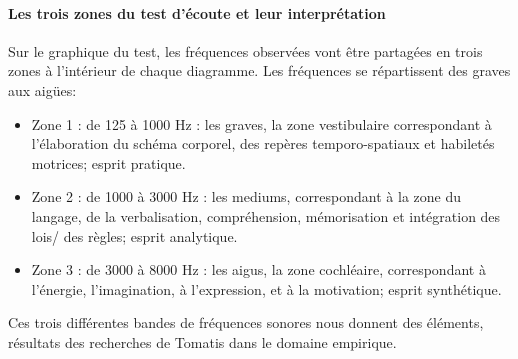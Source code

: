 \paragraph{Les trois zones du test d'écoute et leur interprétation}
Sur le graphique du test, les fréquences observées vont être partagées en
trois zones à l\textquoteright intérieur
de chaque diagramme. Les fréquences se répartissent des
graves aux aigües:
\begin{itemize}
	\item Zone 1 : de 125 à 1000 Hz : les graves, la zone vestibulaire correspondant à l'élaboration
	du schéma corporel, des repères temporo-spatiaux et habiletés motrices; 
	esprit pratique.
	\item Zone 2 : de 1000 à 3000 Hz : les mediums, correspondant à  la zone du langage, de la
	verbalisation, compréhension, %
	mémorisation %
	et intégration des lois/
	des règles; esprit analytique.
	\item Zone 3 : de 3000 à 8000 Hz : les aigus, la zone cochléaire, correspondant à l'énergie,
	 l'imagination, à l'expression, et à la motivation; esprit synthétique.
	
\end{itemize}
Ces trois différentes bandes de fréquences sonores nous donnent des éléments, résultats des   
recherches de Tomatis dans le domaine
empirique. 



